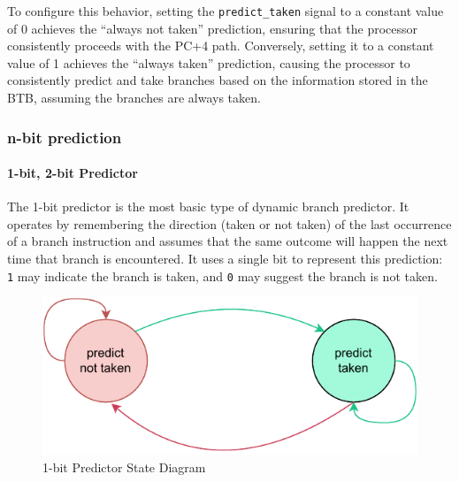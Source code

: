 \documentclass[12pt,a4paper,oneside]{book} %
\begin{document}
To configure this behavior, setting the \texttt{predict\_taken} signal to a constant value of 0 achieves the ``always not taken'' prediction, ensuring that the processor consistently proceeds with the PC+4 path. Conversely, setting it to a constant value of 1 achieves the ``always taken'' prediction, causing the processor to consistently predict and take branches based on the information stored in the BTB, assuming the branches are always taken.



\subsubsection{n-bit prediction}
\paragraph*{1-bit, 2-bit Predictor}

The 1-bit predictor is the most basic type of dynamic branch predictor. It operates by remembering the direction (taken or not taken) of the last occurrence of a branch instruction and assumes that the same outcome will happen the next time that branch is encountered. It uses a single bit to represent this prediction: \texttt{1} may indicate the branch is taken, and \texttt{0} may suggest the branch is not taken.

\begin{figure}[H]
    \centering
    \includegraphics[scale=.90]{images/predictor/taken_not_taken.pdf}
    \caption{1-bit Predictor State Diagram}
\end{figure}
\end{document}

